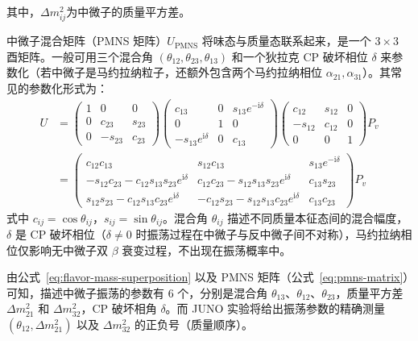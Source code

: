 其中，$\Delta m_{ij}^2$为中微子的质量平方差。

中微子混合矩阵（PMNS 矩阵）$U_{\mathrm{PMNS}}$ 将味态与质量态联系起来，是一个 $3\times3$ 酉矩阵\cite{Maki1962,Pontecorvo1968}。一般可用三个混合角 $(\theta_{12},\theta_{23},\theta_{13})$ 和一个狄拉克 CP 破坏相位 $\delta$ 来参数化（若中微子是马约拉纳粒子，还额外包含两个马约拉纳相位 $\alpha_{21},\alpha_{31}$）。其常见的参数化形式为：
\begin{equation}
\begin{aligned}
U & =\left(\begin{array}{ccc}
1 & 0 & 0 \\
0 & c_{23} & s_{23} \\
0 & -s_{23} & c_{23}
\end{array}\right)\left(\begin{array}{ccc}
c_{13} & 0 & s_{13} e^{-\mathrm{i} \delta} \\
0 & 1 & 0 \\
-s_{13} e^{\mathrm{i} \delta} & 0 & c_{13}
\end{array}\right)\left(\begin{array}{ccc}
c_{12} & s_{12} & 0 \\
-s_{12} & c_{12} & 0 \\
0 & 0 & 1
\end{array}\right) P_v \\
& =\left(\begin{array}{ccc}
c_{12} c_{13} & s_{12} c_{13} & s_{13} e^{-\mathrm{i} \delta} \\
-s_{12} c_{23}-c_{12} s_{13} s_{23} e^{\mathrm{i} \delta} & c_{12} c_{23}-s_{12} s_{13} s_{23} e^{\mathrm{i} \delta} & c_{13} s_{23} \\
s_{12} s_{23}-c_{12} s_{13} c_{23} e^{\mathrm{i} \delta} & -c_{12} s_{23}-s_{12} s_{13} c_{23} e^{\mathrm{i} \delta} & c_{13} c_{23}
\end{array}\right) P_v
\end{aligned}
\label{eq:pmns-matrix}
\end{equation}
式中 $c_{ij}=\cos\theta_{ij}$，$s_{ij}=\sin\theta_{ij}$。混合角 $\theta_{ij}$ 描述不同质量本征态间的混合幅度，$\delta$ 是 CP 破坏相位（$\delta\neq0$ 时振荡过程在中微子与反中微子间不对称），马约拉纳相位仅影响无中微子双 $\beta$ 衰变过程，不出现在振荡概率中。

由公式~\ref{eq:flavor-mass-superposition} 以及 PMNS 矩阵（公式~\ref{eq:pmns-matrix}）可知，描述中微子振荡的参数有 6 个，分别是混合角 $\theta_{13}$、$\theta_{12}$、$\theta_{23}$，质量平方差 $\Delta m_{21}^2$ 和 $\Delta m_{32}^2$，CP 破坏相角 $\delta$。而 JUNO 实验将给出振荡参数的精确测量 $(\theta_{12},\Delta m_{21}^2)$ 以及 $\Delta m_{32}^2$ 的正负号（质量顺序）。

